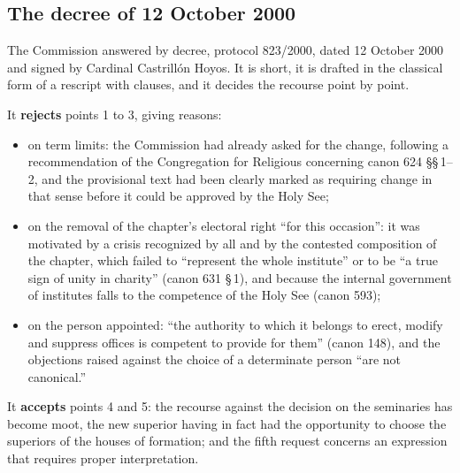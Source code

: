 \subsection{The decree of 12 October 2000}

The Commission answered by decree, protocol 823/2000, dated 12 October
2000 and signed by Cardinal Castrillón Hoyos. It is short, it is drafted
in the classical form of a rescript with  clauses,
and it decides the recourse point by point.

It \textbf{rejects} points 1 to 3, giving reasons:

\begin{itemize}
\item on term limits: the Commission had already asked for the change,
following a recommendation of the Congregation for Religious concerning
canon 624 §§\,1--2, and the provisional text had been clearly marked as
requiring change in that sense before it could be approved by the Holy
See;
\item on the removal of the chapter's electoral right ``for this
occasion'': it was motivated by a crisis recognized by all and by the
contested composition of the chapter, which failed to ``represent the
whole institute'' or to be ``a true sign of unity in charity'' (canon 631
§\,1), and because the internal government of institutes falls to the
competence of the Holy See (canon 593);
\item on the person appointed: ``the authority to which it belongs to
erect, modify and suppress offices is competent to provide for them''
(canon 148), and the objections raised against the choice of a determinate
person ``are not canonical.''
\end{itemize}

It \textbf{accepts} points 4 and 5: the recourse against the decision on
the seminaries has become moot, the new superior having in fact had the
opportunity to choose the superiors of the houses of formation; and the
fifth request concerns an expression that requires proper interpretation.

